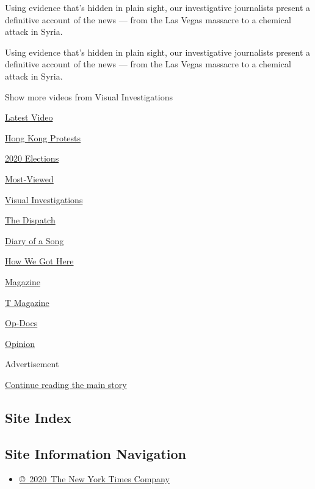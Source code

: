 Using evidence that's hidden in plain sight, our investigative
journalists present a definitive account of the news --- from the Las
Vegas massacre to a chemical attack in Syria.

Using evidence that's hidden in plain sight, our investigative
journalists present a definitive account of the news --- from the Las
Vegas massacre to a chemical attack in Syria.

Show more videos from Visual Investigations

\href{/video}{}

\href{/video/latest-video}{Latest Video}

\href{/video/hk-protest}{Hong Kong Protests}

\href{/video/2020-Elections}{2020 Elections}

\href{/video/Most-Viewed}{Most-Viewed}

\href{/video/investigations}{Visual Investigations}

\href{/video/on-the-ground}{The Dispatch}

\href{/video/diaryofasong}{Diary of a Song}

\href{/video/how-we-got-here}{How We Got Here}

\href{/video/magazine}{Magazine}

\href{/video/t-magazine}{T Magazine}

\href{/video/op-docs}{Op-Docs}

\href{/video/opinion}{Opinion}

Advertisement

\protect\hyperlink{after-bottom}{Continue reading the main story}

\hypertarget{site-index}{%
\subsection{Site Index}\label{site-index}}

\hypertarget{site-information-navigation}{%
\subsection{Site Information
Navigation}\label{site-information-navigation}}

\begin{itemize}
\tightlist
\item
  \href{https://help.nytimes3xbfgragh.onion/hc/en-us/articles/115014792127-Copyright-notice}{©~2020~The
  New York Times Company}
\end{itemize}

